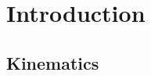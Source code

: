 \documentclass{article}
\begin{document}
\section{Introduction}







\subsection{Kinematics}


\end{document}
